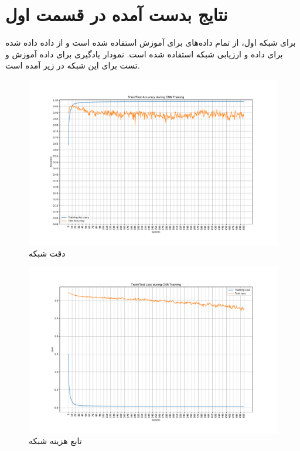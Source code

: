 \documentclass{article}
\begin{document}
\section{نتایج بدست آمده در قسمت اول}
برای شبکه اول، از تمام داده‌های  برای آموزش استفاده شده است و از داده  داده شده برای داده  و ارزیابی شبکه‌ استفاده شده است. نمودار یادگیری برای داده آموزش و تست برای این شبکه در زیر آمده است.
\begin{figure}[H]
	\centerline{\includegraphics[width=\textwidth , height=0.5\textheight ]{../results/figs/Train-Test-Acc}}
	\caption{دقت شبکه }
\end{figure}
\begin{figure}[H]
	\centerline{\includegraphics[width=\textwidth , height=0.5\textheight ]{../results/figs/Train-Test-Loss}}
	\caption{تابع هزینه شبکه }
\end{figure}
\end{document}
